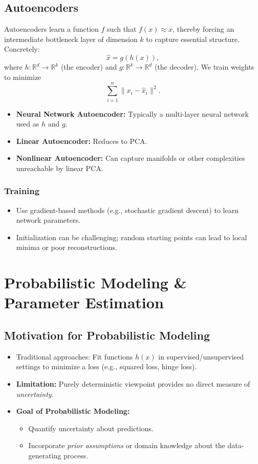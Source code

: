 \documentclass[twocolumn]{article}
\begin{document}
\begin{spacing}{1}
\subsection{Autoencoders}
Autoencoders learn a function $f$ such that $f(x) \approx x$, thereby forcing an intermediate bottleneck layer of dimension $k$ to capture essential structure. Concretely:
\[
    \hat{x} = g(h(x)),
\]
where $h: \mathbb{R}^d \rightarrow \mathbb{R}^k$ (the encoder) and $g: \mathbb{R}^k \rightarrow \mathbb{R}^d$ (the decoder). We train weights to minimize
\[
    \sum_{i=1}^n \| x_i - \hat{x}_i \|^2.
\]
\begin{itemize}
    \item \textbf{Neural Network Autoencoder:} Typically a multi-layer neural network used as $h$ and $g$. 
    \item \textbf{Linear Autoencoder:} Reduces to PCA.
    \item \textbf{Nonlinear Autoencoder:} Can capture manifolds or other complexities unreachable by linear PCA.
\end{itemize}

\subsubsection{Training}
\begin{itemize}
    \item Use gradient-based methods (e.g., stochastic gradient descent) to learn network parameters.
    \item Initialization can be challenging; random starting points can lead to local minima or poor reconstructions.
\end{itemize}


\section{Probabilistic Modeling \& Parameter Estimation}

\subsection{Motivation for Probabilistic Modeling}
\begin{itemize}
    \item Traditional approaches: Fit functions $h(x)$ in supervised/unsupervised settings to minimize a loss (e.g., squared loss, hinge loss).
    \item \textbf{Limitation:} Purely deterministic viewpoint provides no direct measure of \emph{uncertainty}.
    \item \textbf{Goal of Probabilistic Modeling:}
    \begin{itemize}
        \item Quantify uncertainty about predictions.
        \item Incorporate \emph{prior assumptions} or domain knowledge about the data-generating process.
    \end{itemize}
\end{itemize}


\end{spacing}
\end{document}
